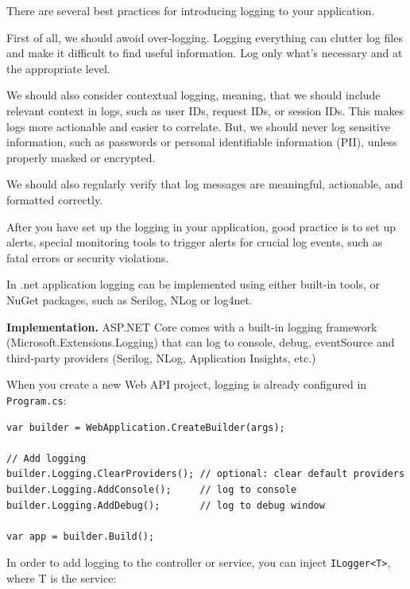 There are several best practices for introducing logging to your application.

First of all, we should awoid over-logging.
Logging everything can clutter log files and make it difficult to find useful information. Log only what’s necessary and at the appropriate level.

We should also consider contextual logging, meaning, that we should include relevant context in logs, such as user IDs, request IDs, or session IDs.
This makes logs more actionable and easier to correlate. But, we should never log sensitive information,
such as passwords or personal identifiable information (PII), unless properly masked or encrypted.

We should also regularly verify that log messages are meaningful, actionable, and formatted correctly.


After you have set up the logging in your application, good practice is to set up alerts, special monitoring tools to trigger alerts for crucial log
events, such as fatal errors or security violations.

In .net application logging can be implemented using either built-in tools, or NuGet packages, such as Serilog, NLog or log4net.

\medskip


\textbf{Implementation.} ASP.NET Core comes with a built-in logging framework (Microsoft.Extensions.Logging) that can log to console, debug, eventSource and third-party providers (Serilog, NLog, Application Insights, etc.)

When you create a new Web API project, logging is already configured in \verb"Program.cs":

\begin{lstlisting}
var builder = WebApplication.CreateBuilder(args);

// Add logging
builder.Logging.ClearProviders(); // optional: clear default providers
builder.Logging.AddConsole();     // log to console
builder.Logging.AddDebug();       // log to debug window

var app = builder.Build();
\end{lstlisting}

In order to add logging to the controller or service, you can inject \verb"ILogger<T>", where T is the service:


